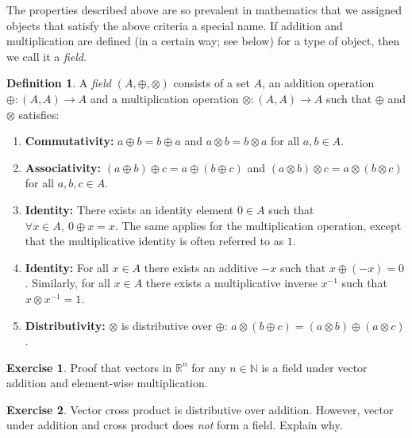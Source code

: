 \documentclass[12pt]{article}
\theoremstyle{definition}
\newtheorem{defn}{Definition}[section]
\newtheorem{ex}{Exercise}[section]
\newcommand{\RR}{\mathbb{R}}
\newcommand{\NN}{\mathbb{N}}
\begin{document}
	The properties described above are so prevalent in mathematics that we assigned objects that satisfy the above criteria a special name. If addition and multiplication are defined (in a certain way; see below) for a type of object, then we call it a \emph{field}.
	
	\begin{defn}
		A \emph{field} $(A, \oplus, \otimes)$ consists of a set $A$, an addition operation $\oplus: (A, A) \to A$ and a multiplication operation $\otimes: (A, A) \to A$ such that $\oplus$ and $\otimes$ satisfies:
		\begin{enumerate}
			\item \textbf{Commutativity:} $a \oplus b = b \oplus a$ and $a \otimes b = b \otimes a$ for all $a, b \in A$.
			\item \textbf{Associativity:} $(a \oplus b) \oplus c = a \oplus (b \oplus c)$ and $(a \otimes b) \otimes c = a \otimes (b \otimes c)$ for all $a, b, c \in A$.
			\item \textbf{Identity:} There exists an identity element $0 \in A$ such that $\forall x \in A,\ 0 \oplus x = x$. The same applies for the multiplication operation, except that the multiplicative identity is often referred to as $1$.
			\item \textbf{Identity:} For all $x \in A$ there exists an additive $-x$ such that $x \oplus (-x) = 0$. Similarly, for all $x \in A$ there exists a multiplicative inverse $x^{-1}$ such that $x \otimes x^{-1} = 1$.
			\item \textbf{Distributivity:} $\otimes$ is distributive over $\oplus$: $a \otimes (b \oplus c) = (a \otimes b) \oplus (a \otimes c)$.
		\end{enumerate}
	\end{defn}
	
	\begin{ex}
		Proof that vectors in $\RR^n$ for any $n \in \NN$ is a field under vector addition and element-wise multiplication.
	\end{ex}
	
	\begin{ex}
		Vector cross product is distributive over addition. However, vector under addition and cross product does \emph{not} form a field. Explain why.
	\end{ex}
	
\end{document}
